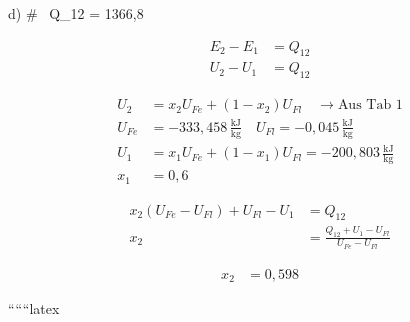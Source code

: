 d) \quad \# \, Q_{12} = 1366,8 \, 

\begin{align*}
E_2 - E_1 &= Q_{12} \\
U_2 - U_1 &= Q_{12}
\end{align*}

\begin{align*}
U_2 &= x_2 U_{Fe} + (1 - x_2) U_{Fl} \quad \rightarrow \text{Aus Tab 1} \\
U_{Fe} &= -333,458 \, \frac{\text{kJ}}{\text{kg}} \quad U_{Fl} = -0,045 \, \frac{\text{kJ}}{\text{kg}} \\
U_1 &= x_1 U_{Fe} + (1 - x_1) U_{Fl} = -200,803 \, \frac{\text{kJ}}{\text{kg}} \\
x_1 &= 0,6
\end{align*}

\begin{align*}
x_2 (U_{Fe} - U_{Fl}) + U_{Fl} - U_1 &= Q_{12} \\
x_2 &= \frac{Q_{12} + U_1 - U_{Fl}}{U_{Fe} - U_{Fl}}
\end{align*}

\begin{align*}
x_2 &= 0,598
\end{align*}

``````latex